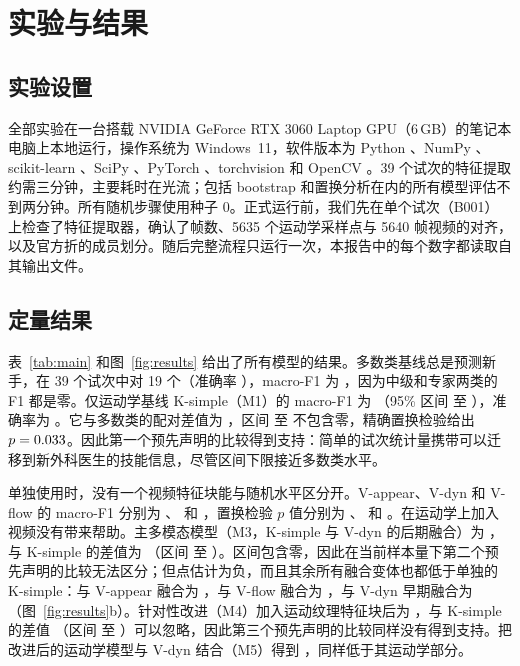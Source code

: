 \section{实验与结果}

\subsection{实验设置}

全部实验在一台搭载 NVIDIA GeForce RTX 3060 Laptop GPU（6\,GB）的笔记本电脑上本地运行，操作系统为 Windows~11，软件版本为 Python \VerPython{}、NumPy \VerNumpy{}、scikit-learn \VerSklearn{}、SciPy \VerScipy{}、PyTorch \VerTorch{}、torchvision \VerTorchvision{} 和 OpenCV \VerOpencv{}。39 个试次的特征提取约需三分钟，主要耗时在光流；包括 bootstrap 和置换分析在内的所有模型评估不到两分钟。所有随机步骤使用种子 0。正式运行前，我们先在单个试次（B001）上检查了特征提取器，确认了帧数、5635 个运动学采样点与 5640 帧视频的对齐，以及官方折的成员划分。随后完整流程只运行一次，本报告中的每个数字都读取自其输出文件。

\subsection{定量结果}

表~\ref{tab:main} 和图~\ref{fig:results} 给出了所有模型的结果。多数类基线总是预测新手，在 39 个试次中对 19 个（准确率 \AccMZero{}），macro-F1 为 \FMZero{}，因为中级和专家两类的 F1 都是零。仅运动学基线 K-simple（M1）的 macro-F1 为 \FMOne{}（95\% 区间 \LoMOne{} 至 \HiMOne{}），准确率为 \AccMOne{}。它与多数类的配对差值为 \DOneZero{}，区间 \DLoOneZero{} 至 \DHiOneZero{} 不包含零，精确置换检验给出 $p = 0.033{}$。因此第一个预先声明的比较得到支持：简单的试次统计量携带可以迁移到新外科医生的技能信息，尽管区间下限接近多数类水平。

\begin{table}[htbp]
\centering
\small
\caption{JIGSAWS 缝合任务上的留一用户结果（39 个试次，8 位外科医生）。Macro-F1、准确率和各类别 F1 均在合并的折外预测上计算。区间为 2000 次用户级 bootstrap 重采样的第 2.5 至 97.5 百分位数；$p$ 为在全部 420 种标签分配上的精确用户级置换检验 $p$ 值。加粗的行分别是运动学基线、主多模态模型和针对性改进。}
\label{tab:main}

\end{table}

单独使用时，没有一个视频特征块能与随机水平区分开。V-appear、V-dyn 和 V-flow 的 macro-F1 分别为 \FMTwoA{}、\FMTwoB{} 和 \FMTwoC{}，置换检验 $p$ 值分别为 \PMTwoA{}、\PMTwoB{} 和 \PMTwoC{}。在运动学上加入视频没有带来帮助。主多模态模型（M3，K-simple 与 V-dyn 的后期融合）为 \FMThree{}，与 K-simple 的差值为 \DThreeOne{}（区间 \DLoThreeOne{} 至 \DHiThreeOne{}）。区间包含零，因此在当前样本量下第二个预先声明的比较无法区分；但点估计为负，而且其余所有融合变体也都低于单独的 K-simple：与 V-appear 融合为 \FMThreeB{}，与 V-flow 融合为 \FMThreeC{}，与 V-dyn 早期融合为 \FMThreeD{}（图~\ref{fig:results}b）。针对性改进（M4）加入运动纹理特征块后为 \FMFour{}，与 K-simple 的差值 \DFourOne{}（区间 \DLoFourOne{} 至 \DHiFourOne{}）可以忽略，因此第三个预先声明的比较同样没有得到支持。把改进后的运动学模型与 V-dyn 结合（M5）得到 \FMFive{}，同样低于其运动学部分。

